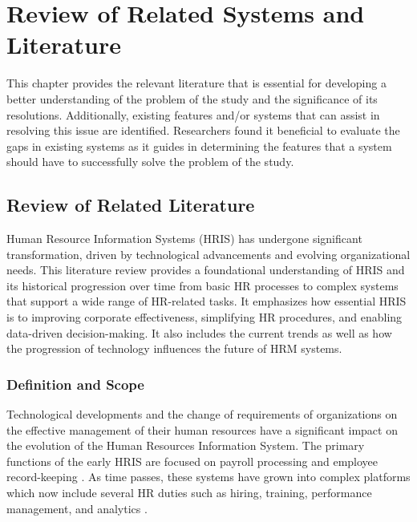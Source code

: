 \chapter{Review of Related Systems and Literature}

This chapter provides the relevant literature that is essential for developing a better understanding of the problem of the study and the significance of its resolutions. Additionally, existing features and/or systems that can assist in resolving this issue are identified. Researchers found it beneficial to evaluate the gaps in existing systems as it guides in determining the features that a system should have to successfully solve the problem of the study.


\section{Review of Related Literature}
    Human Resource Information Systems (HRIS) has undergone significant transformation, driven by technological advancements and evolving organizational needs. This literature review provides a foundational understanding of HRIS and its historical progression over time from basic HR processes to complex systems that support a wide range of HR-related tasks. It emphasizes how essential HRIS is to improving corporate effectiveness, simplifying HR procedures, and enabling data-driven decision-making. It also includes the current trends as well as how the progression of technology influences the future of HRM systems.
    
    \subsection{Definition and Scope}
        Technological developments and the change of requirements of organizations on the effective management of their human resources have a significant impact on the evolution of the Human Resources Information System. The primary functions of the early HRIS are focused on payroll processing and employee record-keeping \cite{srr12023}. As time passes, these systems have grown into complex platforms which now include several HR duties such as hiring, training, performance management, and analytics \cite{ml12019}.
        \\
        
